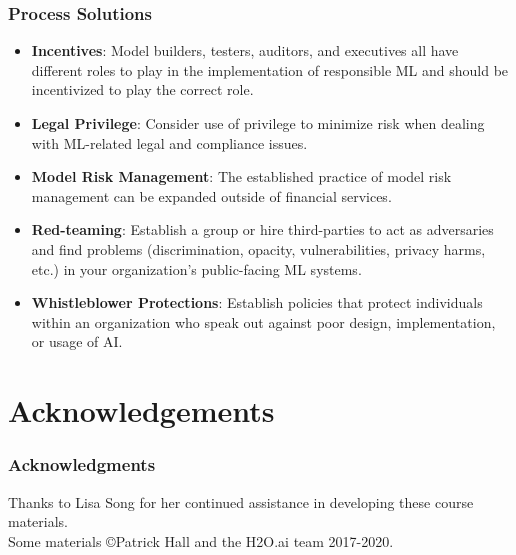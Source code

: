 \documentclass[11pt,
               aspectratio=169,
               hyperref={colorlinks}
               ]{beamer}
\begin{document}
		\begin{frame}
			
			\frametitle{Process Solutions}	
				
			\begin{itemize}
				
				\item \textbf{Incentives}: Model builders, testers, auditors, and executives all have different roles to play in the implementation of responsible ML and should be incentivized to play the correct role.
				
				\item \textbf{Legal Privilege}: Consider use of privilege to minimize risk when dealing with ML-related legal and compliance issues.
				
				\item \textbf{Model Risk Management}: The established practice of model risk management can be expanded outside of financial services.
				
				\item \textbf{Red-teaming}: Establish a group or hire third-parties to act as adversaries and find problems (discrimination, opacity, vulnerabilities, privacy harms, etc.) in your organization's public-facing ML systems.
				
				\item \textbf{Whistleblower Protections}: Establish policies that protect individuals within an organization who speak out against poor design, implementation, or usage of AI. 
				
			\end{itemize}
			
		\end{frame}	

\section{Acknowledgements} 

\begin{frame}
	
	\frametitle{Acknowledgments}
	
	Thanks to Lisa Song for her continued assistance in developing these course materials.\\
	\vspace{10pt}
	Some materials \copyright\hspace{1pt}Patrick Hall and the H2O.ai team 2017-2020.  
	
\end{frame}	
\end{document}
